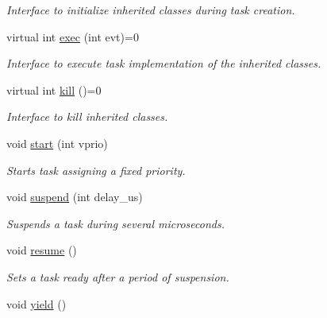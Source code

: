 \begin{DoxyCompactItemize}
\begin{DoxyCompactList}\small\item\em Interface to initialize inherited classes during task creation. \end{DoxyCompactList}\item 
virtual int \hyperlink{class_task_ab17886ef8196862de81aef338fd27424}{exec} (int evt)=0
\begin{DoxyCompactList}\small\item\em Interface to execute task implementation of the inherited classes. \end{DoxyCompactList}\item 
\hypertarget{class_task_ad1591a816cf4ab538ad158a487446c3f}{virtual int \hyperlink{class_task_ad1591a816cf4ab538ad158a487446c3f}{kill} ()=0}\label{class_task_ad1591a816cf4ab538ad158a487446c3f}

\begin{DoxyCompactList}\small\item\em Interface to kill inherited classes. \end{DoxyCompactList}\item 
void \hyperlink{class_task_a1d4e4a8a23ecc05e36b7bf7ff078459f}{start} (int vprio)
\begin{DoxyCompactList}\small\item\em Starts task assigning a fixed priority. \end{DoxyCompactList}\item 
void \hyperlink{class_task_aba51f0ee66f2f42e361be6cc8639e5fc}{suspend} (int delay\-\_\-us)
\begin{DoxyCompactList}\small\item\em Suspends a task during several microseconds. \end{DoxyCompactList}\item 
\hypertarget{class_task_a6fbcbc8e4d264bd9230fc794ea898d53}{void \hyperlink{class_task_a6fbcbc8e4d264bd9230fc794ea898d53}{resume} ()}\label{class_task_a6fbcbc8e4d264bd9230fc794ea898d53}

\begin{DoxyCompactList}\small\item\em Sets a task ready after a period of suspension. \end{DoxyCompactList}\item 
\hypertarget{class_task_ac9858ec2b4431b9fe06cecda3b901f0f}{void \hyperlink{class_task_ac9858ec2b4431b9fe06cecda3b901f0f}{yield} ()}\label{class_task_ac9858ec2b4431b9fe06cecda3b901f0f}


\end{DoxyCompactItemize}

